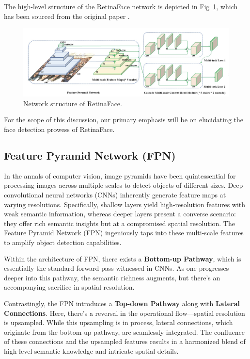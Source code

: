 \documentclass{article}
\begin{document}
The high-level structure of the RetinaFace network is depicted in Fig~\ref{fig:structure}, which has been sourced from the original paper \cite{deng2020retinaface}.

\begin{figure}[h]
  \centering
  \includegraphics[width=0.7\linewidth]{images/network_structure}
  \caption{Network structure of RetinaFace.}
  \label{fig:structure}
\end{figure}

For the scope of this discussion, our primary emphasis will be on elucidating the face detection prowess of RetinaFace.

\subsection{Feature Pyramid Network (FPN)}

In the annals of computer vision, image pyramids have been quintessential for processing images across multiple scales to detect objects of different sizes. Deep convolutional neural networks (CNNs) inherently generate feature maps at varying resolutions. Specifically, shallow layers yield high-resolution features with weak semantic information, whereas deeper layers present a converse scenario: they offer rich semantic insights but at a compromised spatial resolution. The Feature Pyramid Network (FPN) \cite{lin2017feature} ingeniously taps into these multi-scale features to amplify object detection capabilities.

Within the architecture of FPN, there exists a \textbf{Bottom-up Pathway}, which is essentially the standard forward pass witnessed in CNNs. As one progresses deeper into this pathway, the semantic richness augments, but there's an accompanying sacrifice in spatial resolution.

Contrastingly, the FPN introduces a \textbf{Top-down Pathway} along with \textbf{Lateral Connections}. Here, there's a reversal in the operational flow—spatial resolution is upsampled. While this upsampling is in process, lateral connections, which originate from the bottom-up pathway, are seamlessly integrated. The confluence of these connections and the upsampled features results in a harmonized blend of high-level semantic knowledge and intricate spatial details.
\end{document}
